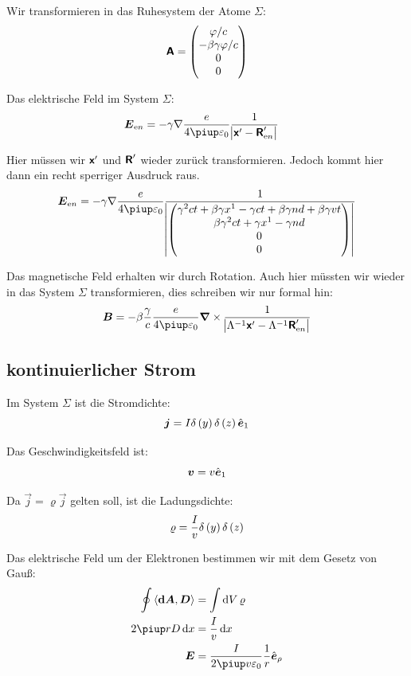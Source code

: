 Wir transformieren in das Ruhesystem der Atome $\Sigma$:
\[
	\boldsymbol{\mathsf{A}}
	=
	\begin{pmatrix}
		\varphi / c \\ - \beta \gamma \varphi / c \\ 0 \\ 0
	\end{pmatrix}
\]

Das elektrische Feld im System $\Sigma$:
\begin{align*}
	\vec E_{\text en}
	&= - \gamma \nabla \frac{e}{4 \piup \varepsilon_0}
	\frac{1}{\abs{\tens x' - \tens R'_{\text en}}}
\end{align*}

Hier müssen wir $\boldsymbol{\mathsf{x}}'$ und $\boldsymbol{\mathsf{R}}'$ wieder zurück transformieren. Jedoch
kommt hier dann ein recht sperriger Ausdruck raus.
\[
	\vec E_{\text en}
	=
	- \gamma \nabla \frac{e}{4 \piup \varepsilon_0} \frac{1}{
		\abs{
			\begin{pmatrix}
				\gamma^2 ct + \beta \gamma x^1 - \gamma ct + \beta \gamma nd + \beta\gamma vt \\
				\beta \gamma^2 ct + \gamma x^1 - \gamma nd \\
				0 \\
				0
			\end{pmatrix}
		}
	}
\]

Das magnetische Feld erhalten wir durch Rotation. Auch hier müssten wir wieder
in das System $\Sigma$ transformieren, dies schreiben wir nur formal hin:
\[
	\vec B = - \beta \frac \gamma c \frac{e}{4\piup\varepsilon_0} \curl 
	\frac{1}{\abs{\Lambda^{-1} \tens x' - \Lambda^{-1} \tens R'_{\text en}}}
\]

\subsection{kontinuierlicher Strom}

Im System $\Sigma$ ist die Stromdichte:
\[
	\vec j = I \delta\del y \delta\del z \ev_1
\]

Das Geschwindigkeitsfeld ist:
\[
	\boldsymbol{v} = v \hat{\boldsymbol{e}}_1
\]

Da $\vec j = \varrho \vec j$ gelten soll, ist die Ladungsdichte:
\[
	\varrho = \frac Iv \delta\del y \delta\del z
\]

Das elektrische Feld um der Elektronen bestimmen wir mit dem Gesetz von Gauß:
\begin{align*}
	\oint \inner{\vec{\dif A}}{\vec D}
	&=
	\int \dif V \, \varrho \\
	2 \piup r D \dif x &= \frac Iv \dif x \\
	\vec E &= \frac{I}{2\piup v \varepsilon_0} \frac 1r \ev_\rho
\end{align*}

